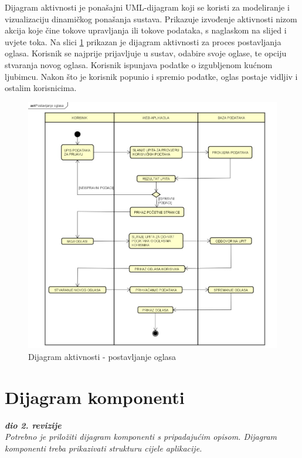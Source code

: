 			 Dijagram aktivnosti je ponašajni UML-dijagram koji se koristi za modeliranje i vizualizaciju dinamičkog ponašanja sustava. Prikazuje izvođenje aktivnosti nizom akcija koje čine tokove upravljanja ili tokove podataka, s naglaskom na slijed i uvjete toka. Na slici \ref{fig:dijagramaktivnosti} prikazan je dijagram aktivnosti za proces postavljanja oglasa. Korisnik se najprije prijavljuje u sustav, odabire svoje oglase, te opciju stvaranja novog oglasa. Korisnik ispunjava podatke o izgubljenom kućnom ljubimcu. Nakon što je korisnik popunio i spremio podatke, oglas postaje vidljiv i ostalim korisnicima.
			
			\begin{figure}[H]
				\includegraphics[width=\textwidth]{dijagram_aktivnosti.JPEG}
				\centering
				\caption{Dijagram aktivnosti - postavljanje oglasa}
				\label{fig:dijagramaktivnosti}
			\end{figure}
			
			\eject
		\section{Dijagram komponenti}
		
			\textbf{\textit{dio 2. revizije}}\\
		
			 \textit{Potrebno je priložiti dijagram komponenti s pripadajućim opisom. Dijagram komponenti treba prikazivati strukturu cijele aplikacije.}